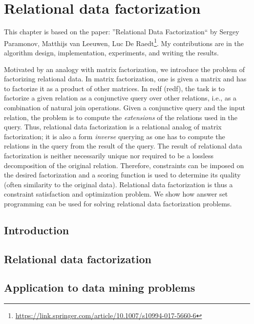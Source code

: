 \chapter{Relational data factorization}\label{ch:ReDF}
This chapter is based on the paper: ''Relational Data Factorization`` by Sergey Paramonov, Matthijs van Leeuwen, Luc De Raedt\footnote{\url{https://link.springer.com/article/10.1007/s10994-017-5660-6}}. My contributions are in the algorithm design, implementation, experiments, and writing the results.


\newcommand{\redfpath}{chapters/ReDF/tex_files}


Motivated by an analogy with matrix factorization, we introduce the problem of factorizing relational data. In matrix factorization, one is given a matrix and has to factorize it as a product of other matrices. In \acrlong{redf} (\acrshort{redf}), the task is to factorize a given relation as a conjunctive query over other relations, i.e., as a combination of natural join operations. Given a conjunctive query and the input relation, the problem is to compute the \emph{extensions} of the relations used in the query. Thus, relational data factorization is a relational analog of matrix factorization; it is also a form {\em inverse} querying as one has to compute the relations in the query from the result of the query.  The result of relational data factorization is neither necessarily unique nor required to be a lossless decomposition of the original relation. Therefore, constraints can be imposed on the desired factorization and a scoring function is used to determine its quality (often similarity to the original data). Relational data factorization is thus a constraint satisfaction and optimization problem. We show how answer set programming can be used for solving relational data factorization problems. 


\section{Introduction}
 
\section{Relational data factorization}
\label{section:framework}


\section{Application to data mining problems}
\label{section:dm_problems}

